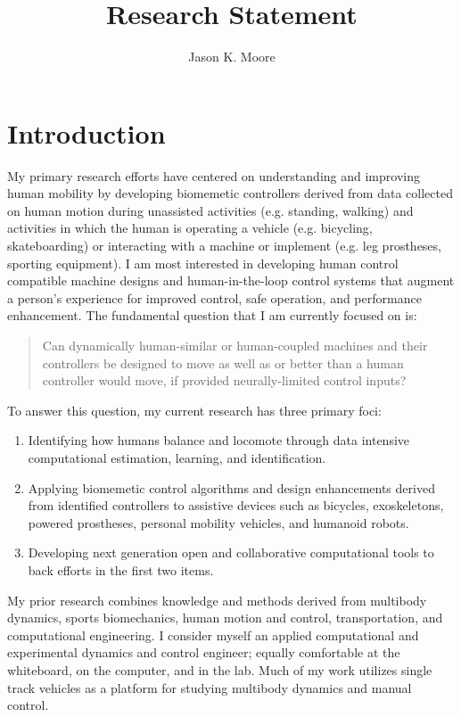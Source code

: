 \documentclass{article}
\title{Research Statement}
\author{Jason K. Moore}
\date{}
\begin{document}
\maketitle

\section*{Introduction}
%
My primary research efforts have centered on understanding and improving human
mobility by developing biomemetic controllers derived from data collected on
human motion during unassisted activities (e.g. standing, walking) and
activities in which the human is operating a vehicle (e.g. bicycling,
skateboarding) or interacting with a machine or implement (e.g. leg prostheses,
sporting equipment). I am most interested in developing human control
compatible machine designs and human-in-the-loop control systems that augment a
person's experience for improved control, safe operation, and performance
enhancement. The fundamental question that I am currently focused on is:
%
\begin{quote}
 Can dynamically human-similar or human-coupled machines and their controllers
 be designed to move as well as or better than a human controller would move,
 if provided neurally-limited control inputs?
\end{quote}

To answer this question, my current research has three primary foci:
%
\begin{enumerate}
  \setlength\itemsep{0.1em}
  \item Identifying how humans balance and locomote through data intensive
    computational estimation, learning, and identification.
  \item Applying biomemetic control algorithms and design enhancements derived
    from identified controllers to assistive devices such as bicycles,
    exoskeletons, powered prostheses, personal mobility vehicles, and humanoid
    robots.
  \item Developing next generation open and collaborative computational tools
    to back efforts in the first two items.
 \end{enumerate}

My prior research combines knowledge and methods derived from multibody
dynamics, sports biomechanics, human motion and control, transportation, and
computational engineering. I consider myself an applied computational and
experimental dynamics and control engineer; equally comfortable at the
whiteboard, on the computer, and in the lab. Much of my work utilizes single
track vehicles as a platform for studying multibody dynamics and manual
control.
\end{document}
